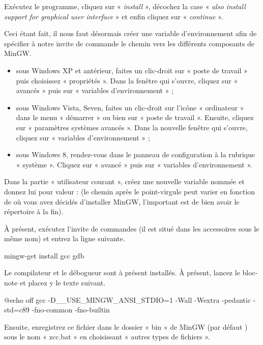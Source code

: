 Exécutez le programme, cliquez sur « \emph{install} », décochez la
case « \emph{also install support for graphical user interface} » et
enfin cliquez sur « \emph{continue} ».

Ceci étant fait, il nous faut désormais créer une variable
d'environnement afin de spécifier à notre invite de commande le chemin
vers les différents composants de MinGW.

\begin{itemize}
\item sous Windows XP et antérieur, faites un clic-droit sur « poste
  de travail » puis choisissez « propriétés ». Dans la fenêtre qui
  s'ouvre, cliquez sur « avancés » puis sur « variables
  d'environnement » ;
\item sous Windows Vista, Seven, faites un clic-droit sur l'icône «
  ordinateur » dans le menu « démarrer » ou bien sur « poste de
  travail ». Ensuite, cliquez sur « paramètres systèmes avancés
  ». Dans la nouvelle fenêtre qui s'ouvre, cliquez sur « variables
  d'environnement » ;
\item sous Windows 8, rendez-vous dans le panneau de configuration à
  la rubrique « système ». Cliquez sur « avancé » puis sur « variables
  d'environnement ».
\end{itemize}

\bigbreak

Dans la partie « utilisateur courant », créez une nouvelle variable
nommée  et donnez lui pour valeur :
 (le chemin
après le point-virgule peut varier en fonction de où vous avez décidés
d'installer MinGW, l'important est de bien avoir le répertoire
 à la fin).

À présent, exécutez l'invite de commandes (il est situé dans les
accessoires sous le même nom) et entrez la ligne suivante.

\begin{bash}
  mingw-get install gcc gdb
\end{bash}

Le compilateur et le débogueur sont à présent installés. À présent,
lancez le bloc-note et placez y le texte suivant.

\begin{bash}
  @echo off gcc -D__USE_MINGW_ANSI_STDIO=1 -Wall -Wextra -pedantic -std=c89 -fno-common
    -fno-builtin %
\end{bash}

Ensuite, enregistrez ce fichier dans le dossier « bin » de MinGW (par
défaut ) sous le nom
« zcc.bat » en choisissant « autres types de fichiers ».

